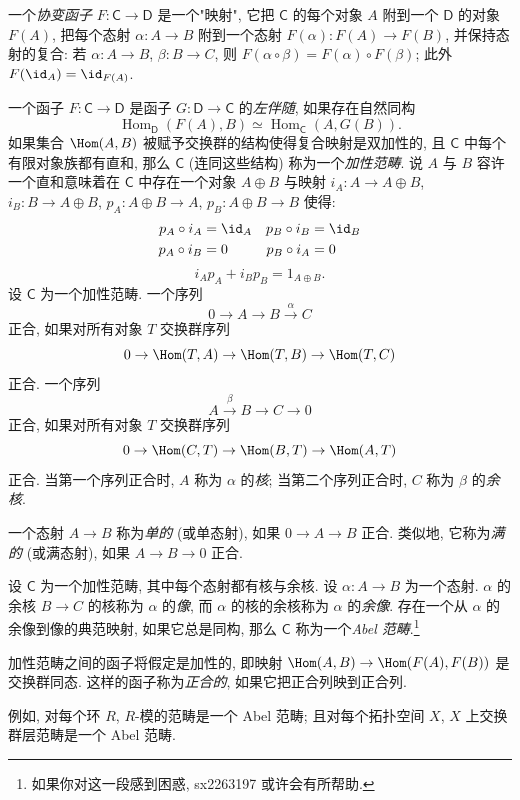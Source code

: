一个\emph{协变函子} $F\colon \mathsf{C}\to \mathsf{D}$ 是一个"映射", 它把 $\mathsf{C}$ 的每个对象 $A$ 附到一个 $\mathsf{D}$ 的对象 $F(A)$, 把每个态射 $\alpha\colon A\to B$ 附到一个态射 $F(\alpha)\colon F(A)\to F(B)$, 并保持态射的复合: 若 $\alpha\colon A\to B$, $\beta\colon B\to C$, 则 $F(\alpha\circ\beta)=F(\alpha)\circ F(\beta)$; 此外 $F(\id_A)=\id_{F(A)}$.

一个函子 $F\colon \mathsf{C}\to \mathsf{D}$ 是函子 $G\colon \mathsf{D}\to \mathsf{C}$ 的\emph{左伴随}, 如果存在自然同构
\[
 \operatorname{Hom}_{\mathsf{D}}(F(A),B)\simeq \operatorname{Hom}_{\mathsf{C}}(A,G(B)).
\]
如果集合 $\Hom(A,B)$ 被赋予交换群的结构使得复合映射是双加性的, 且 $\mathsf{C}$ 中每个有限对象族都有直和, 那么 $\mathsf{C}$ (连同这些结构) 称为一个\emph{加性范畴}. 说 $A$ 与 $B$ 容许一个直和意味着在 $\mathsf{C}$ 中存在一个对象 $A\oplus B$ 与映射 $i_A\colon A\to A\oplus B$, $i_B\colon B\to A\oplus B$, $p_A\colon A\oplus B\to A$, $p_B\colon A\oplus B\to B$ 使得:
\[
 \begin{aligned}
 p_A\circ i_A&=\id_A & p_B\circ i_B&=\id_B\\
 p_A\circ i_B&=0 & p_B\circ i_A&=0
 \end{aligned}
\]
\[
 i_A p_A+i_B p_B=1_{A\oplus B}.
\]
设 $\mathsf{C}$ 为一个加性范畴. 一个序列
\[
 0\to A\to B\xrightarrow{\alpha} C
\]
正合, 如果对所有对象 $T$ 交换群序列
\[
 0\to \Hom(T,A)\to \Hom(T,B)\to \Hom(T,C)
\]
正合. 一个序列
\[
 A\xrightarrow{\beta} B\to C\to 0
\]
正合, 如果对所有对象 $T$ 交换群序列
\[
 0\to \Hom(C,T)\to \Hom(B,T)\to \Hom(A,T)
\]
正合. 当第一个序列正合时, $A$ 称为 $\alpha$ 的\emph{核}; 当第二个序列正合时, $C$ 称为 $\beta$ 的\emph{余核}.

一个态射 $A\to B$ 称为\emph{单的} (或单态射), 如果 $0\to A\to B$ 正合. 类似地, 它称为\emph{满的} (或满态射), 如果 $A\to B\to 0$ 正合.

设 $\mathsf{C}$ 为一个加性范畴, 其中每个态射都有核与余核. 设 $\alpha\colon A\to B$ 为一个态射. $\alpha$ 的余核 $B\to C$ 的核称为 $\alpha$ 的\emph{像}, 而 $\alpha$ 的核的余核称为 $\alpha$ 的\emph{余像}. 存在一个从 $\alpha$ 的余像到像的典范映射, 如果它总是同构, 那么 $\mathsf{C}$ 称为一个\emph{Abel 范畴}.\footnote{如果你对这一段感到困惑, sx2263197 或许会有所帮助.}

加性范畴之间的函子将假定是加性的, 即映射 $\Hom(A,B)\to \Hom(F(A),F(B))$ 是交换群同态. 这样的函子称为\emph{正合的}, 如果它把正合列映到正合列.

例如, 对每个环 $R$, $R$-模的范畴是一个 Abel 范畴; 且对每个拓扑空间 $X$, $X$ 上交换群层范畴是一个 Abel 范畴.


